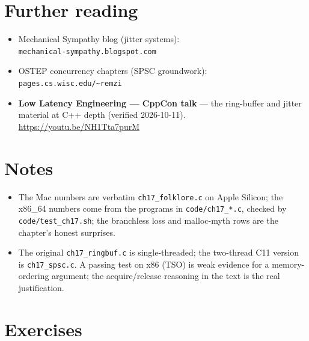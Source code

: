 \section*{Further reading}
\begin{itemize}
\item Mechanical Sympathy blog (jitter systems): \\ \texttt{mechanical-sympathy.blogspot.com}
\item OSTEP concurrency chapters (SPSC groundwork): \texttt{pages.cs.wisc.edu/\~{}remzi}
\end{itemize}

\begin{rulebox}
\begin{itemize}
\item \textbf{Low Latency Engineering --- CppCon talk} --- the
      ring-buffer and jitter material at C++ depth
      (verified 2026-10-11).
      \url{https://youtu.be/NH1Tta7purM}
\end{itemize}
\end{rulebox}

\section*{Notes}
\begin{itemize}
\item The Mac numbers are verbatim \texttt{ch17\_folklore.c} on Apple
      Silicon; the x86\_64 numbers come from the programs in
      \texttt{code/ch17\_*.c}, checked by \texttt{code/test\_ch17.sh}; the branchless loss and malloc-myth rows are the
      chapter's honest surprises.
\item The original \texttt{ch17\_ringbuf.c} is single-threaded; the
      two-thread C11 version is \texttt{ch17\_spsc.c}. A passing test on
      x86 (TSO) is weak evidence for a memory-ordering argument; the
      acquire/release reasoning in the text is the real justification.
\end{itemize}

\section*{Exercises}

